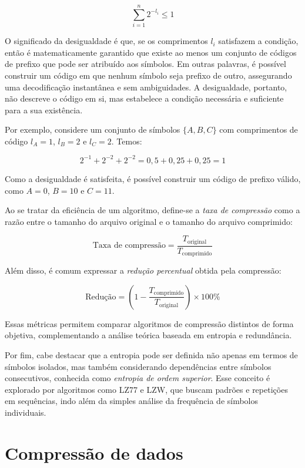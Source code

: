 \begin{equation}
\sum_{i=1}^{n} 2^{-l_i} \leq 1
\end{equation}

O significado da desigualdade é que, se os comprimentos \(l_i\) satisfazem a condição, então é matematicamente garantido que existe ao menos um conjunto de códigos de prefixo que pode ser atribuído aos símbolos. Em outras palavras, é possível construir um código em que nenhum símbolo seja prefixo de outro, assegurando uma decodificação instantânea e sem ambiguidades. A desigualdade, portanto, não descreve o código em si, mas estabelece a condição necessária e suficiente para a sua existência.

Por exemplo, considere um conjunto de símbolos $\{A, B, C\}$ com comprimentos de código $l_A = 1$, $l_B = 2$ e $l_C = 2$. Temos:

\[
2^{-1} + 2^{-2} + 2^{-2} = 0,5 + 0,25 + 0,25 = 1
\]

Como a desigualdade é satisfeita, é possível construir um código de prefixo válido, como $A = 0$, $B = 10$ e $C = 11$.  

Ao se tratar da eficiência de um algoritmo, define-se a \textit{taxa de compressão} como a razão entre o tamanho do arquivo original e o tamanho do arquivo comprimido:

\begin{equation}
\text{Taxa de compressão} = \frac{T_{\text{original}}}{T_{\text{comprimido}}}
\end{equation}

Além disso, é comum expressar a \textit{redução percentual} obtida pela compressão:

\begin{equation}
\text{Redução} = \left( 1 - \frac{T_{\text{comprimido}}}{T_{\text{original}}} \right) \times 100\%
\end{equation}

Essas métricas permitem comparar algoritmos de compressão distintos de forma objetiva, complementando a análise teórica baseada em entropia e redundância.  

Por fim, cabe destacar que a entropia pode ser definida não apenas em termos de símbolos isolados, mas também considerando dependências entre símbolos consecutivos, conhecida como \textit{entropia de ordem superior}. Esse conceito é explorado por algoritmos como LZ77 e LZW, que buscam padrões e repetições em sequências, indo além da simples análise da frequência de símbolos individuais.

\section{Compressão de dados}
\label{sec:compressao_dados}

